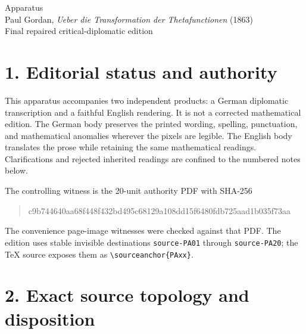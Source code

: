 \documentclass[10pt]{article}
\begin{document}
\small

\begin{center}
{\Large Apparatus}\\[0.4em]
{\large Paul Gordan, \textit{Ueber die Transformation der Thetafunctionen} (1863)}\\[0.35em]
{\normalsize Final repaired critical-diplomatic edition}
\end{center}

\section*{1. Editorial status and authority}

This apparatus accompanies two independent products: a German diplomatic transcription and a faithful English rendering. It is not a corrected mathematical edition. The German body preserves the printed wording, spelling, punctuation, and mathematical anomalies wherever the pixels are legible. The English body translates the prose while retaining the same mathematical readings. Clarifications and rejected inherited readings are confined to the numbered notes below.

The controlling witness is the 20-unit authority PDF with SHA-256
\begin{quote}\ttfamily\small
c9b744640aa68f448f432bd495c68129a108dd15f6480fdb725aad1b035f73aa
\end{quote}
The convenience page-image witnesses were checked against that PDF. The edition uses stable invisible destinations \texttt{source-PA01} through \texttt{source-PA20}; the TeX source exposes them as \verb|\sourceanchor{PAxx}|.

\section*{2. Exact source topology and disposition}
\end{document}
